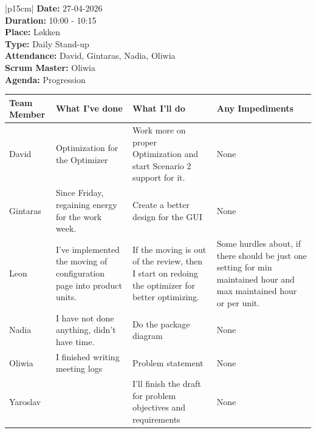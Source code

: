 \begin{table}[H]
    \centering
    \begin{tabular}{|p{15cm}|}   
        \hline
        \textbf{Date:}  27-04-2026 \\
        \textbf{Duration:} 10:00 - 10:15 \\
        \textbf{Place:}  Løkken \\
        \textbf{Type:} Daily Stand-up \\
        \textbf{Attendance:} David, Gintaras, Nadia, Oliwia \\
        \textbf{Scrum Master:}  Oliwia \\
        \textbf{Agenda:} Progression
        \begin{table}[H]
            \begin{tabular}{|p{1.75cm}|p{4cm}|p{4cm}|p{4cm}|}
                \hline
                \cellcolor[HTML]{BFBFBF}  \textbf{Team Member} & \cellcolor[HTML]{BFBFBF}  \textbf{What I've done} & \cellcolor[HTML]{BFBFBF}  \textbf{What I'll do} & \cellcolor[HTML]{BFBFBF}  \textbf{Any Impediments}\\
                \hline
                \cellcolor[HTML]{d4d4d4} David & Optimization for the Optimizer & Work more on proper Optimization and start Scenario 2 support for it. & None \\
                \hline
                \cellcolor[HTML]{d4d4d4} Gintaras & Since Friday, regaining energy for the work week. & Create a better design for the GUI & None \\
                \hline
                \cellcolor[HTML]{d4d4d4} Leon & I've implemented the moving of configuration page into product units.  & If the moving is out of the review, then I start on redoing the optimizer for better optimizing. & Some hurdles about, if there should be just one setting for min maintained hour and max maintained hour or per unit. \\
                \hline
                \cellcolor[HTML]{d4d4d4} Nadia & I have not done anything, didn't have time. & Do the package diagram  & None \\
                \hline
                \cellcolor[HTML]{d4d4d4} Oliwia & I finished writing meeting logs & Problem statement & None \\
                \hline
                \cellcolor[HTML]{d4d4d4} Yaroslav &  & I’ll finish the draft for problem objectives and requirements & None \\
                \hline
            \end{tabular}
        \end{table}
        \\
        \hline
    \end{tabular}
\end{table}


